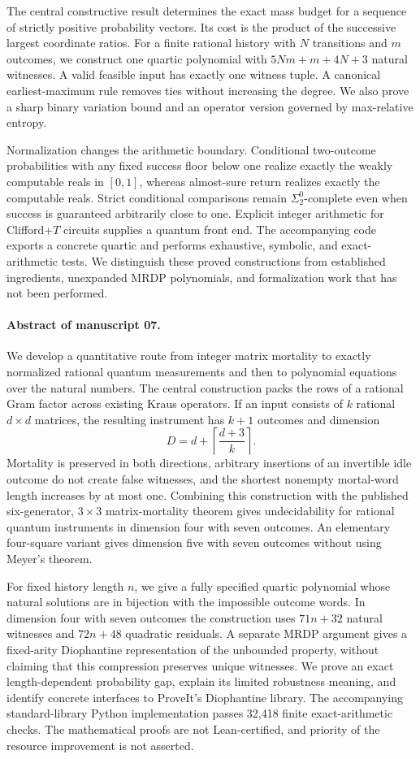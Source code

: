 \documentclass[11pt,letterpaper]{article}
\numberwithin{equation}{section}
\theoremstyle{definition}
\theoremstyle{remark}
\begin{document}
The central constructive result determines the exact mass budget for a
sequence of strictly positive probability vectors. Its cost is the product
of the successive largest coordinate ratios. For a finite rational history
with $N$ transitions and $m$ outcomes, we construct one quartic polynomial
with $5Nm+m+4N+3$ natural witnesses. A valid feasible input has exactly one
witness tuple. A canonical earliest-maximum rule removes ties without
increasing the degree. We also prove a sharp binary variation bound and an
operator version governed by max-relative entropy.

Normalization changes the arithmetic boundary. Conditional two-outcome
probabilities with any fixed success floor below one realize exactly the
weakly computable reals in $[0,1]$, whereas almost-sure return realizes exactly
the computable reals. Strict conditional comparisons remain
$\Sigma^0_2$-complete even when success is guaranteed arbitrarily close to
one. Explicit integer arithmetic for Clifford+$T$ circuits supplies a quantum
front end. The accompanying code exports a concrete quartic and performs
exhaustive, symbolic, and exact-arithmetic tests. We distinguish these proved
constructions from established ingredients, unexpanded MRDP polynomials,
and formalization work that has not been performed.

\paragraph{Abstract of manuscript 07.}
We develop a quantitative route from integer matrix mortality to exactly normalized rational quantum measurements and then to polynomial equations over the natural numbers. The central construction packs the rows of a rational Gram factor across existing Kraus operators. If an input consists of $k$ rational $d\times d$ matrices, the resulting instrument has $k+1$ outcomes and dimension
\[
 D=d+\left\lceil\frac{d+3}{k}\right\rceil.
\]
Mortality is preserved in both directions, arbitrary insertions of an invertible idle outcome do not create false witnesses, and the shortest nonempty mortal-word length increases by at most one. Combining this construction with the published six-generator, $3\times3$ matrix-mortality theorem gives undecidability for rational quantum instruments in dimension four with seven outcomes. An elementary four-square variant gives dimension five with seven outcomes without using Meyer's theorem.

For fixed history length $n$, we give a fully specified quartic polynomial whose natural solutions are in bijection with the impossible outcome words. In dimension four with seven outcomes the construction uses $71n+32$ natural witnesses and $72n+48$ quadratic residuals. A separate MRDP argument gives a fixed-arity Diophantine representation of the unbounded property, without claiming that this compression preserves unique witnesses. We prove an exact length-dependent probability gap, explain its limited robustness meaning, and identify concrete interfaces to ProveIt's Diophantine library. The accompanying standard-library Python implementation passes 32,418 finite exact-arithmetic checks. The mathematical proofs are not Lean-certified, and priority of the resource improvement is not asserted.
\end{document}
